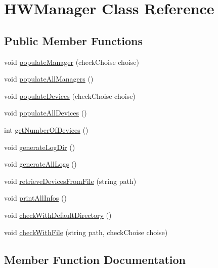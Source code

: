 \hypertarget{classHWManager}{}\section{H\+W\+Manager Class Reference}
\label{classHWManager}
\subsection*{Public Member Functions}
\begin{DoxyCompactItemize}
\item 
void \hyperlink{classHWManager_a867e8247ccb2c2853cde8d4461aa5b7d}{populate\+Manager} (check\+Choise choise)
\item 
void \hyperlink{classHWManager_aeec8928295c6658cfbd3b292872d8f41}{populate\+All\+Managers} ()
\item 
void \hyperlink{classHWManager_a1b94c4885dc128d740686b5bb96caec8}{populate\+Devices} (check\+Choise choise)
\item 
void \hyperlink{classHWManager_a91d0c86ad3344faf5cac802ea3f38516}{populate\+All\+Devices} ()
\item 
int \hyperlink{classHWManager_aea84312971b2f37424ac48b98ec6aeca}{get\+Number\+Of\+Devices} ()
\item 
void \hyperlink{classHWManager_a19ca6cfbb5d1e7f83a14a6a35b1fa303}{generate\+Log\+Dir} ()
\item 
void \hyperlink{classHWManager_a17459fb942af258ec4ac39d34c70bad8}{generate\+All\+Logs} ()
\item 
void \hyperlink{classHWManager_a9bd4de108a88b3554526e50fe67b3e71}{retrieve\+Devices\+From\+File} (string path)
\item 
void \hyperlink{classHWManager_a95a7659252ca203578a74ec393ad94f7}{print\+All\+Infos} ()
\item 
void \hyperlink{classHWManager_a1fe7d46d9978b65ffb1d29de7cc4a93c}{check\+With\+Default\+Directory} ()
\item 
void \hyperlink{classHWManager_a175ba9eab5c1f149aafc491636f36390}{check\+With\+File} (string path, check\+Choise choise)
\end{DoxyCompactItemize}


\subsection{Member Function Documentation}
